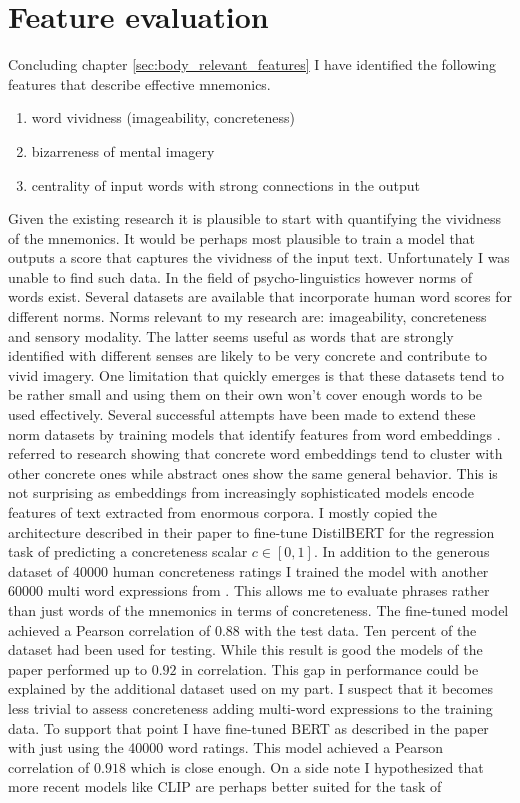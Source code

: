 \section{Feature evaluation} \label{sec:body_feature_evaluation}

Concluding chapter \ref{sec:body_relevant_features} I have identified the following features that describe effective mnemonics. 
\begin{enumerate}
    \item word vividness (imageability, concreteness)
    \item bizarreness of mental imagery
    \item centrality of input words with strong connections in the output
\end{enumerate}

Given the existing research it is plausible to start with quantifying the vividness of the mnemonics. It would be perhaps most plausible to train a model that outputs a score that captures the vividness of the input text. Unfortunately I was unable to find such data. In the field of psycho-linguistics however norms of words exist. Several datasets are available that incorporate human word scores for different norms. Norms relevant to my research are: imageability, concreteness and sensory modality. The latter seems useful as words that are strongly identified with different senses are likely to be very concrete and contribute to vivid imagery. One limitation that quickly emerges is that these datasets tend to be rather small and using them on their own won't cover enough words to be used effectively. Several successful attempts have been made to extend these norm datasets by training models that identify features from word embeddings \cite{concr_embed_bert, img_concr_svm, fusing_ctx_embed_concr}. \cite{concr_embed_bert} referred to research showing that concrete word embeddings tend to cluster with other concrete ones while abstract ones show the same general behavior. This is not surprising as embeddings from increasingly sophisticated models encode features of text extracted from enormous corpora. I mostly copied the architecture described in their paper to fine-tune DistilBERT for the regression task of predicting a concreteness scalar $c \in [0,1]$. In addition to the generous dataset of 40000 human concreteness ratings \cite{40000_concr} I trained the model with another 60000 multi word expressions from \cite{60000_concr}. This allows me to evaluate phrases rather than just words of the mnemonics in terms of concreteness. The fine-tuned model achieved a Pearson correlation of $0.88$ with the test data. Ten percent of the dataset had been used for testing. While this result is good the models of the paper performed up to $0.92$ in correlation. This gap in performance could be explained by the additional dataset used on my part. I suspect that it becomes less trivial to assess concreteness adding multi-word expressions to the training data. To support that point I have fine-tuned BERT as described in the paper with just using the 40000 word ratings. This model achieved a Pearson correlation of $0.918$ which is close enough. On a side note I hypothesized that more recent models like CLIP are perhaps better suited for the task of 